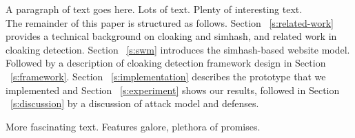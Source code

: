 A paragraph of text goes here.  Lots of text.  Plenty of interesting
text. \\


The remainder of this paper is structured as follows. Section
~\autoref{s:related-work} provides a
technical background on cloaking and simhash, and related work in cloaking
detection. Section ~\autoref{s:swm} introduces the simhash-based website model.
Followed by a description of cloaking detection framework design in 
Section ~\autoref{s:framework}. Section ~\autoref{s:implementation} describes the 
prototype that we implemented and Section ~\autoref{s:experiment} shows our results,
followed in  Section ~\autoref{s:discussion} by a discussion of attack
model and defenses.



More fascinating text. Features galore, plethora of promises.\\



